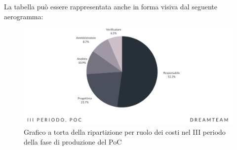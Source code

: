 La tabella può essere rappresentata anche in forma visiva dal seguente aerogramma:
\begin{figure}[!h]
\centering
\includegraphics[scale=0.65]{Sezioni/SezioniPreventivo/grafici/Poc_III_periodo_costi.png}
\caption{Grafico a torta della ripartizione per ruolo dei costi nel III periodo della fase di produzione del PoC}
\end{figure}




